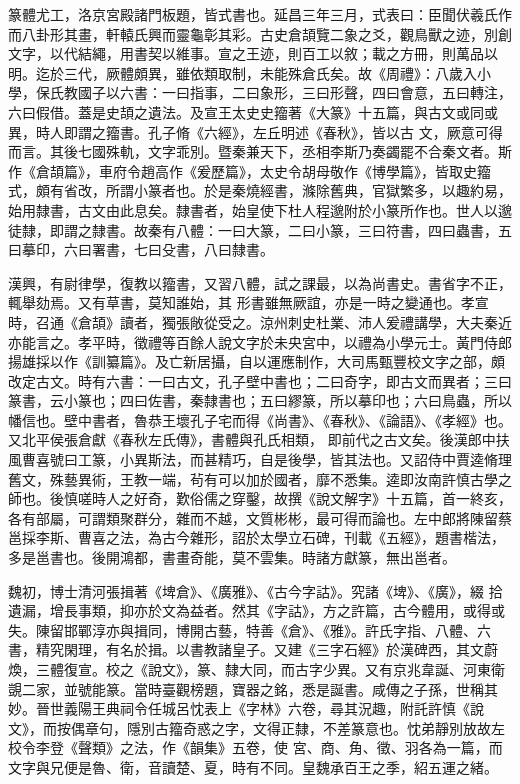 \begin{pinyinscope}
 篆體尤工，洛京宮殿諸門板題，皆式書也。延昌三年三月，式表曰：臣聞伏羲氏作而八卦形其畫，軒轅氏興而靈龜彰其彩。古史倉頡覽二象之爻，觀鳥獸之迹，別創文字，以代結繩，用書契以維事。宣之王迹，則百工以敘；載之方冊，則萬品以明。迄於三代，厥體頗異，雖依類取制，未能殊倉氏矣。故《周禮》：八歲入小學，保氏教國子以六書：一曰指事，二曰象形，三曰形聲，四曰會意，五曰轉注，六曰假借。蓋是史頡之遺法。及宣王太史史籀著《大篆》十五篇，與古文或同或異，時人即謂之籀書。孔子脩《六經》，左丘明述《春秋》，皆以古
 文，厥意可得而言。其後七國殊軌，文字乖別。暨秦兼天下，丞相李斯乃奏蠲罷不合秦文者。斯作《倉頡篇》，車府令趙高作《爰歷篇》，太史令胡母敬作《博學篇》，皆取史籀式，頗有省改，所謂小篆者也。於是秦燒經書，滌除舊典，官獄繁多，以趣約易，始用隸書，古文由此息矣。隸書者，始皇使下杜人程邈附於小篆所作也。世人以邈徒隸，即謂之隸書。故秦有八體：一曰大篆，二曰小篆，三曰符書，四曰蟲書，五曰摹印，六曰署書，七曰殳書，八曰隸書。



 漢興，有尉律學，復教以籀書，又習八體，試之課最，以為尚書史。書省字不正，輒舉劾焉。又有草書，莫知誰始，其
 形書雖無厥誼，亦是一時之變通也。孝宣時，召通《倉頡》讀者，獨張敞從受之。涼州刺史杜業、沛人爰禮講學，大夫秦近亦能言之。孝平時，徵禮等百餘人說文字於未央宮中，以禮為小學元士。黃門侍郎揚雄採以作《訓纂篇》。及亡新居攝，自以運應制作，大司馬甄豐校文字之部，頗改定古文。時有六書：一曰古文，孔子壁中書也；二曰奇字，即古文而異者；三曰篆書，云小篆也；四曰佐書，秦隸書也；五曰繆篆，所以摹印也；六曰鳥蟲，所以幡信也。壁中書者，魯恭王壞孔子宅而得《尚書》、《春秋》、《論語》、《孝經》也。又北平侯張倉獻《春秋左氏傳》，書體與孔氏相類，
 即前代之古文矣。後漢郎中扶風曹喜號曰工篆，小異斯法，而甚精巧，自是後學，皆其法也。又詔侍中賈逵脩理舊文，殊藝異術，王教一端，茍有可以加於國者，靡不悉集。逵即汝南許慎古學之師也。後慎嗟時人之好奇，歎俗儒之穿鑿，故撰《說文解字》十五篇，首一終亥，各有部屬，可謂類聚群分，雜而不越，文質彬彬，最可得而論也。左中郎將陳留蔡邕採李斯、曹喜之法，為古今雜形，詔於太學立石碑，刊載《五經》，題書楷法，多是邕書也。後開鴻都，書畫奇能，莫不雲集。時諸方獻篆，無出邕者。



 魏初，博士清河張揖著《埤倉》、《廣雅》、《古今字詁》。究諸《埤》、《廣》，綴
 拾遺漏，增長事類，抑亦於文為益者。然其《字詁》，方之許篇，古今體用，或得或失。陳留邯鄲淳亦與揖同，博開古藝，特善《倉》、《雅》。許氏字指、八體、六書，精究閑理，有名於揖。以書教諸皇子。又建《三字石經》於漢碑西，其文蔚煥，三體復宣。校之《說文》，篆、隸大同，而古字少異。又有京兆韋誕、河東衛覬二家，並號能篆。當時臺觀榜題，寶器之銘，悉是誕書。咸傳之子孫，世稱其妙。晉世義陽王典祠令任城呂忱表上《字林》六卷，尋其況趣，附託許慎《說文》，而按偶章句，隱別古籀奇惑之字，文得正隸，不差篆意也。忱弟靜別放故左校令李登《聲類》之法，作《韻集》五卷，使
 宮、商、角、徵、羽各為一篇，而文字與兄便是魯、衛，音讀楚、夏，時有不同。皇魏承百王之季，紹五運之緒。




\end{pinyinscope}
